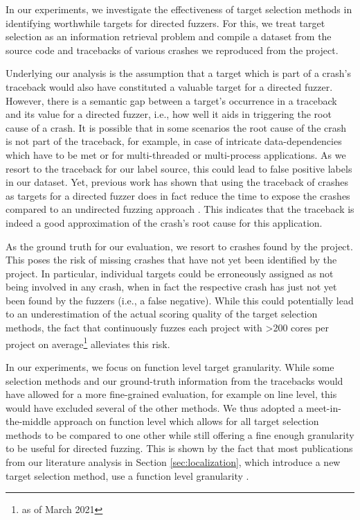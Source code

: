 In our experiments, we investigate the effectiveness of target selection methods in identifying worthwhile targets for directed fuzzers. For this, we treat target selection as an information retrieval problem and compile a dataset from the source code and tracebacks of various crashes we reproduced from the \ossfuzz{} project.

Underlying our analysis is the assumption that a target which is part of a crash's traceback would also have constituted a valuable target for a directed fuzzer. However, there is a semantic gap between a target's occurrence in a traceback and its value for a directed fuzzer, i.e., how well it aids in triggering the root cause of a crash. It is possible that in some scenarios the root cause of the crash is not part of the traceback, for example, in case of intricate data-dependencies which have to be met or for multi-threaded or multi-process applications. As we resort to the traceback for our label source, this could lead to false positive labels in our dataset. Yet, previous work has shown that using the traceback of crashes as targets for a directed fuzzer does in fact reduce the time to expose the crashes compared to an undirected fuzzing approach \cite{CheXueLiChe+18, DuLiLiuMao+22, BoePhaNguRoy17}. This indicates that the traceback is indeed a good approximation of the crash's root cause for this application.

As the ground truth for our evaluation, we resort to crashes found by the \ossfuzz{} project. This poses the risk of missing crashes that have not yet been identified by the project. In particular, individual targets could be erroneously assigned as not being involved in any crash, when in fact the respective crash has just not yet been found by the fuzzers (i.e., a false negative). While this could potentially lead to an underestimation of the actual scoring quality of the target selection methods, the fact that \ossfuzz{} continuously fuzzes each project with >200 cores per project on average\footnote{as of March 2021} alleviates this risk.

In our experiments, we focus on function level target granularity. While some selection methods and our ground-truth information from the tracebacks would have allowed for a more fine-grained evaluation, for example on line level, this would have excluded several of the other methods. We thus adopted a meet-in-the-middle approach on function level which allows for all target selection methods to be compared to one other while still offering a fine enough granularity to be useful for directed fuzzing. This is shown by the fact that most publications from our literature analysis in Section \ref{sec:localization}, which introduce a new target selection method, use a function level granularity \cite{CaoHeSunOuy+23, ZhaLiaXiaZha+22, ZheZhaHuaRen+23, DuCheLiGuo+19, KruGriRos22}.